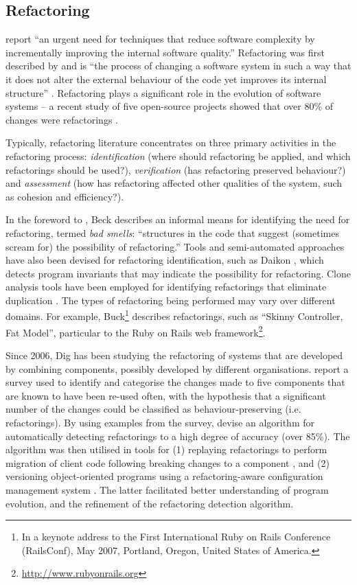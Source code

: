 \subsection{Refactoring}
\label{subsec:refactoring}
\cite{mens04survey} report ``an urgent need for techniques that reduce software complexity by incrementally improving the internal software quality.'' Refactoring was first described by \cite{opdyke92refactoring} and is ``the process of changing a software system in such a way that it does not alter the external behaviour of the code yet improves its internal structure'' \cite[pg. xvi]{fowler99refactoring}. Refactoring plays a significant role in the evolution of software systems -- a recent study of five open-source projects showed that over 80\% of changes were refactorings \cite{dig06apis}.

Typically, refactoring literature concentrates on three primary activities in the refactoring process: \emph{identification} (where should refactoring be applied, and which refactorings should be used?), \emph{verification} (has refactoring preserved behaviour?) and \emph{assessment} (how has refactoring affected other qualities of the system, such as cohesion and efficiency?).

In the foreword to \cite{fowler99refactoring}, Beck describes an informal means for identifying the need for refactoring, termed \textit{bad smells}: ``structures in the code that suggest (sometimes scream for) the possibility of refactoring.'' Tools and semi-automated approaches have also been devised for refactoring identification, such as Daikon \cite{kataoka01automated}, which detects program invariants that may indicate the possibility for refactoring. Clone analysis tools have been employed for identifying refactorings that eliminate duplication \cite{balazinska00advanced,ducasse99language}. The types of refactoring being performed may vary over different domains. For example, Buck\footnote{In a keynote address to the First International Ruby on Rails Conference (RailsConf), May 2007, Portland, Oregon, United States of America.} describes refactorings, such as ``Skinny Controller, Fat Model'', particular to the Ruby on Rails web framework\footnote{\url{http://www.rubyonrails.org}}.

Since 2006, Dig has been studying the refactoring of systems that are developed by combining components, possibly developed by different organisations. \cite{dig06apis} report a survey used to identify and categorise the changes made to five components that are known to have been re-used often, with the hypothesis that a significant number of the changes could be classified as behaviour-preserving (i.e. refactorings). By using examples from the survey, \cite{dig06detection} devise an algorithm for automatically detecting refactorings to a high degree of accuracy (over 85\%). The algorithm was then utilised in tools for (1) replaying refactorings to perform migration of client code following breaking changes to a component \cite{dig06automatic}, and (2) versioning object-oriented programs using a refactoring-aware configuration management system \cite{dig07cms}. The latter facilitated better understanding of program evolution, and the refinement of the refactoring detection algorithm.


